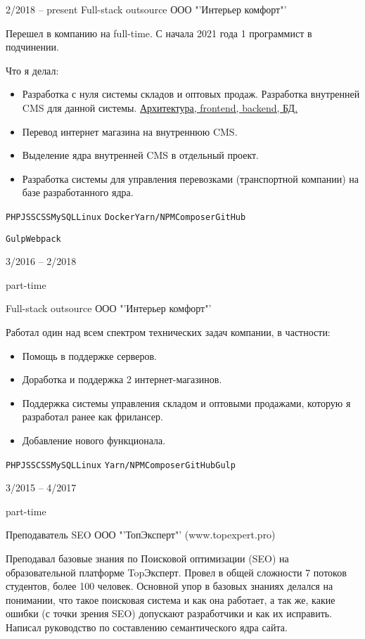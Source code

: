 \begin{entrylist}
	\entry
		{2/2018 -- present}
		{Full-stack outsource}
		{ООО "'Интерьер комфорт"' }
		{Перешел в компанию на full-time. С начала 2021 года 1 программист в подчинении.

    Что я делал:
    \small\begin{itemize}
      \item Разработка с нуля системы складов и оптовых продаж. Разработка внутренней CMS для данной системы. \underline{Архитектура, frontend, backend, БД.}
      \item Перевод интернет магазина на внутреннюю CMS.
      \item Выделение ядра внутренней CMS в отдельный проект.
      \item Разработка системы для управления перевозками (транспортной компании) на базе разработанного ядра.
    \end{itemize}


		\texttt{PHP}\slashsep\texttt{JS}\slashsep\texttt{SCSS}\slashsep\texttt{MySQL}\slashsep\texttt{Linux}
    \slashsep\texttt{Docker}\slashsep\texttt{Yarn/NPM}\slashsep\texttt{Composer}\slashsep\texttt{GitHub}

    \texttt{Gulp}\slashsep\texttt{Webpack}}

	\entry
		{3/2016 -- 2/2018

		\footnotesize{part-time}}
		{Full-stack outsource}
		{ООО "'Интерьер комфорт"' }
		{Работал один над всем спектром технических задач компании, в частности:
    \small\begin{itemize}
      \item Помощь в поддержке серверов.
      \item Доработка и поддержка 2 интернет-магазинов.
      \item Поддержка системы управления складом и оптовыми продажами, которую я разработал ранее как фрилансер.
      \item Добавление нового функционала.
    \end{itemize}

		\texttt{PHP}\slashsep\texttt{JS}\slashsep\texttt{SCSS}\slashsep\texttt{MySQL}\slashsep\texttt{Linux}
    \slashsep\texttt{Yarn/NPM}\slashsep\texttt{Composer}\slashsep\texttt{GitHub}\slashsep\texttt{Gulp}
    }

	\entry
		{3/2015 -- 4/2017

		\footnotesize{part-time}}
		{Преподаватель SEO}
		{ООО "'ТопЭксперт"' (www.topexpert.pro)}
		{Преподавал базовые знания по Поисковой оптимизации (SEO) на образовательной платформе TopЭксперт. Провел в общей сложности 7 потоков студентов, более 100 человек. Основной упор в базовых знаниях делался на понимании, что такое поисковая система и как она работает, а так же, какие ошибки (с точки зрения SEO) допускают разработчики и как их исправить. Написал руководство по составлению семантического ядра сайта.

}
\end{entrylist}
